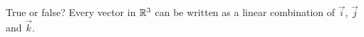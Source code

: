 \documentclass{ximera}
\author{Anna Davis}
\begin{document}
\begin{exercise}
True or false?  Every vector in $\mathbb{R}^3$ can be written as a linear combination of $\vec{i}$, $\vec{j}$ and $\vec{k}$.
\begin{multipleChoice}
 \end{multipleChoice}
\end{exercise}
\end{document}
